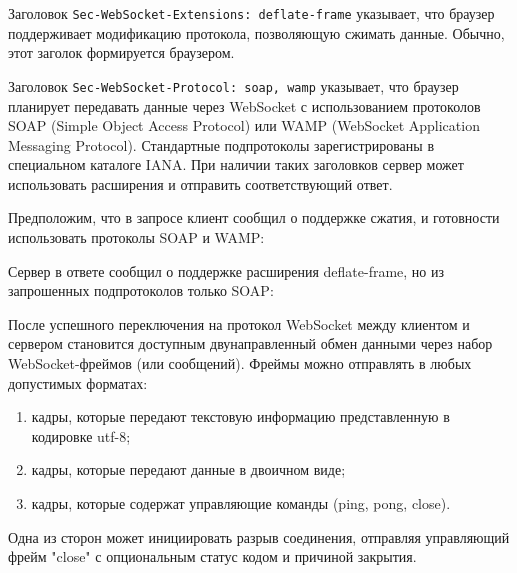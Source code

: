 Заголовок \texttt{Sec-WebSocket-Extensions: deflate-frame} указывает, что браузер поддерживает модификацию протокола, позволяющую сжимать данные. Обычно, этот заголок формируется браузером.

Заголовок \texttt{Sec-WebSocket-Protocol: soap, wamp} указывает, что браузер планирует передавать данные через WebSocket с использованием протоколов SOAP (Simple Object Access Protocol) или WAMP (WebSocket Application Messaging Protocol). Стандартные подпротоколы зарегистрированы в специальном каталоге IANA. При наличии таких заголовков сервер может использовать расширения и отправить соответствующий ответ.

Предположим, что в запросе клиент сообщил о поддержке сжатия, и готовности использовать протоколы SOAP и WAMP:


Сервер в ответе сообщил о поддержке расширения deflate-frame, но из запрошенных подпротоколов только SOAP:


После успешного переключения на протокол WebSocket между клиентом и сервером становится доступным двунаправленный обмен данными через набор WebSocket-фреймов (или сообщений). Фреймы можно отправлять в любых допустимых форматах:
\begin{enumerate}
\item кадры, которые передают текстовую информацию представленную в кодировке utf-8;
\item кадры, которые передают данные в двоичном виде;
\item кадры, которые содержат управляющие команды (ping, pong, close).
\end{enumerate}
Одна из сторон может инициировать разрыв соединения, отправляя управляющий фрейм "close" с опциональным статус кодом и причиной закрытия.

